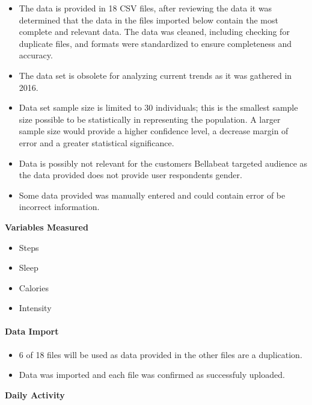 \documentclass[
]{article}
\providecommand{\tightlist}{%
  \setlength{\itemsep}{0pt}\setlength{\parskip}{0pt}}
\begin{document}
\begin{itemize}
\tightlist
\item
  The data is provided in 18 CSV files, after reviewing the data it was
  determined that the data in the files imported below contain the most
  complete and relevant data. The data was cleaned, including checking
  for duplicate files, and formats were standardized to ensure
  completeness and accuracy.
\item
  The data set is obsolete for analyzing current trends as it was
  gathered in 2016.
\item
  Data set sample size is limited to 30 individuals; this is the
  smallest sample size possible to be statistically in representing the
  population. A larger sample size would provide a higher confidence
  level, a decrease margin of error and a greater statistical
  significance.
\item
  Data is possibly not relevant for the customers Bellabeat targeted
  audience as the data provided does not provide user respondents
  gender.
\item
  Some data provided was manually entered and could contain error of be
  incorrect information.
\end{itemize}

\textbf{Variables Measured}\\

\begin{itemize}
\tightlist
\item
  Steps
\item
  Sleep
\item
  Calories
\item
  Intensity
\end{itemize}

\paragraph{\texorpdfstring{\textbf{Data
Import}}{Data Import}}\label{data-import}

\begin{itemize}
\tightlist
\item
  6 of 18 files will be used as data provided in the other files are a
  duplication.
\item
  Data was imported and each file was confirmed as successfuly uploaded.
\end{itemize}

\textbf{Daily Activity}
\end{document}
